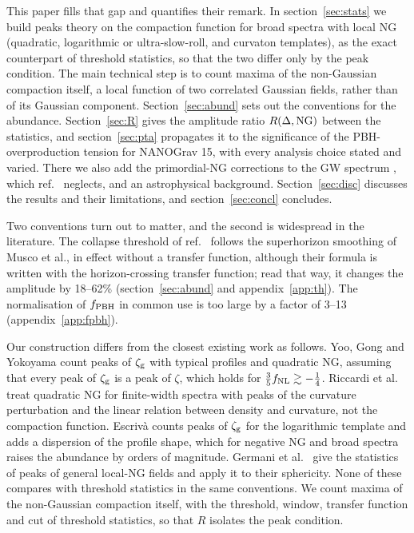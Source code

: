 \documentclass[a4paper,11pt]{article}
\newcommand{\zg}{\zeta_{\rm g}}
\newcommand{\fnl}{f_{\rm NL}}
\newcommand{\fpbh}{f_{\rm PBH}}
\begin{document}
This paper fills that gap and quantifies their remark. In section~\ref{sec:stats} we build peaks
theory on the compaction function for broad spectra with local NG (quadratic, logarithmic or
ultra-slow-roll, and curvaton templates), as the exact counterpart of threshold statistics, so
that the two differ only by the peak condition. The main technical step is to count maxima of the
non-Gaussian compaction itself, a local function of two correlated Gaussian fields, rather than
of its Gaussian component. Section~\ref{sec:abund} sets out the conventions for the abundance.
Section~\ref{sec:R} gives the amplitude ratio $R(\Delta,{\rm NG})$ between the statistics, and
section~\ref{sec:pta} propagates it to the significance of the PBH-overproduction tension for
NANOGrav 15, with every analysis choice stated and varied. There we also add the primordial-NG
corrections to the GW spectrum \cite{CPS19,Unal19,ALW21}, which ref.~\cite{FIVT23} neglects, and an
astrophysical background. Section~\ref{sec:disc} discusses the results and their limitations,
and section~\ref{sec:concl} concludes.

Two conventions turn out to matter, and the second is widespread in the literature. The collapse
threshold of ref.~\cite{FIVT23} follows the superhorizon smoothing of Musco et al., in effect
without a transfer function, although their formula is written with the horizon-crossing transfer
function; read that way, it changes the amplitude by 18--62\% (section~\ref{sec:abund} and
appendix~\ref{app:th}). The normalisation of $\fpbh$ in common use is too large by a factor of
3--13 (appendix~\ref{app:fpbh}).

Our construction differs from the closest existing work as follows. Yoo, Gong and Yokoyama
\cite{YGY19} count peaks of $\zg$ with typical profiles and quadratic NG, assuming that every peak
of $\zg$ is a peak of $\zeta$, which holds for $\frac35\fnl\gtrsim-\frac14$. Riccardi et
al.~\cite{Riccardi} treat quadratic NG for finite-width spectra with peaks of the curvature
perturbation and the linear relation between density and curvature, not the compaction function.
Escriv\`a \cite{Escriva26} counts peaks of $\zg$ for the logarithmic template and adds a
dispersion of the profile shape, which for negative NG and broad spectra raises the abundance by
orders of magnitude. Germani et al.~\cite{Germani25} give the statistics of peaks of general
local-NG fields and apply it to their sphericity. None of these compares with threshold statistics
in the same conventions. We count maxima of the non-Gaussian compaction itself, with the
threshold, window, transfer function and cut of threshold statistics, so that $R$ isolates the
peak condition.
\end{document}
